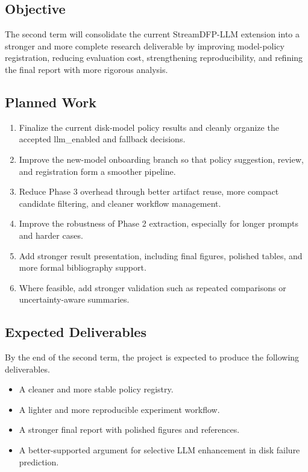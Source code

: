 \documentclass[
  11pt,
  a4paper]{article}
\providecommand{\tightlist}{%
  \setlength{\itemsep}{0pt}\setlength{\parskip}{0pt}}
\begin{document}
\hypertarget{objective}{%
\subsection{Objective}\label{objective}}

The second term will consolidate the current StreamDFP-LLM extension
into a stronger and more complete research deliverable by improving
model-policy registration, reducing evaluation cost, strengthening
reproducibility, and refining the final report with more rigorous
analysis.

\hypertarget{planned-work}{%
\subsection{Planned Work}\label{planned-work}}

\begin{enumerate}
\def\labelenumi{\arabic{enumi}.}
\tightlist
\item
  Finalize the current disk-model policy results and cleanly organize
  the accepted llm\_enabled and fallback decisions.
\item
  Improve the new-model onboarding branch so that policy suggestion,
  review, and registration form a smoother pipeline.
\item
  Reduce Phase 3 overhead through better artifact reuse, more compact
  candidate filtering, and cleaner workflow management.
\item
  Improve the robustness of Phase 2 extraction, especially for longer
  prompts and harder cases.
\item
  Add stronger result presentation, including final figures, polished
  tables, and more formal bibliography support.
\item
  Where feasible, add stronger validation such as repeated comparisons
  or uncertainty-aware summaries.
\end{enumerate}

\hypertarget{expected-deliverables}{%
\subsection{Expected Deliverables}\label{expected-deliverables}}

By the end of the second term, the project is expected to produce the
following deliverables.

\begin{itemize}
\tightlist
\item
  A cleaner and more stable policy registry.
\item
  A lighter and more reproducible experiment workflow.
\item
  A stronger final report with polished figures and references.
\item
  A better-supported argument for selective LLM enhancement in disk
  failure prediction.
\end{itemize}
\end{document}
